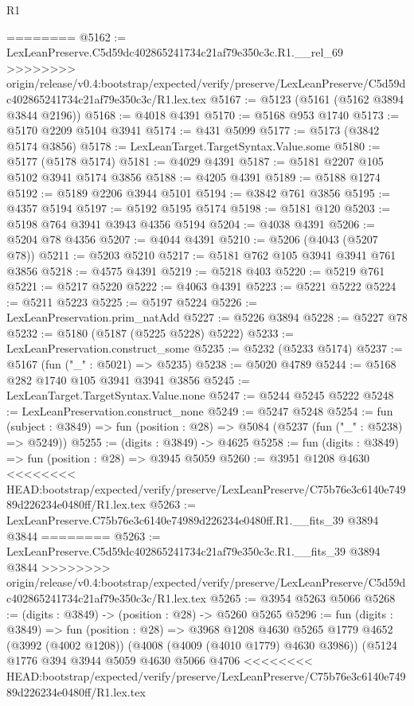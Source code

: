 \begin{lexlean}{R1}
\begin{coremodule}
{{{{{{{{{{{{{{{{{{{{{{{{{{{{{{{{{{{{{{{{{{{{{{{{{{{{{{{{{{{{{{{{{{{{{{{{{{{{{{{{{{{{{{{{{{{{{{{{{{{{{{{{{{{{{{{{{{{{{{{{{{{{{{{{{{{{{{{{{{{{{{{{{{{{{{{{{{{{{{{{{{{{{{{{{{{{{{{{{{{{{{{{{{========
@5162 := LexLeanPreserve.C5d59dc402865241734c21af79e350c3c.R1.__rel_69
>>>>>>>> origin/release/v0.4:bootstrap/expected/verify/preserve/LexLeanPreserve/C5d59dc402865241734c21af79e350c3c/R1.lex.tex
@5167 := @5123 (@5161 (@5162 @3894 @3844 @2196))
@5168 := @4018 @4391
@5170 := @5168 @953 @1740
@5173 := @5170 @2209 @5104 @3941
@5174 := @431 @5099
@5177 := @5173 (@3842 @5174 @3856)
@5178 := LexLeanTarget.TargetSyntax.Value.some
@5180 := @5177 (@5178 @5174)
@5181 := @4029 @4391
@5187 := @5181 @2207 @105 @5102 @3941 @5174 @3856
@5188 := @4205 @4391
@5189 := @5188 @1274
@5192 := @5189 @2206 @3944 @5101
@5194 := @3842 @761 @3856
@5195 := @4357 @5194
@5197 := @5192 @5195 @5174
@5198 := @5181 @120
@5203 := @5198 @764 @3941 @3943 @4356 @5194
@5204 := @4038 @4391
@5206 := @5204 @78 @4356
@5207 := @4044 @4391
@5210 := @5206 (@4043 (@5207 @78))
@5211 := @5203 @5210
@5217 := @5181 @762 @105 @3941 @3941 @761 @3856
@5218 := @4575 @4391
@5219 := @5218 @403
@5220 := @5219 @761
@5221 := @5217 @5220
@5222 := @4063 @4391
@5223 := @5221 @5222
@5224 := @5211 @5223
@5225 := @5197 @5224
@5226 := LexLeanPreservation.prim_natAdd
@5227 := @5226 @3894
@5228 := @5227 @78
@5232 := @5180 (@5187 (@5225 @5228) @5222)
@5233 := LexLeanPreservation.construct_some
@5235 := @5232 (@5233 @5174)
@5237 := @5167 (fun ("_" : @5021) => @5235)
@5238 := @5020 @4789
@5244 := @5168 @282 @1740 @105 @3941 @3941 @3856
@5245 := LexLeanTarget.TargetSyntax.Value.none
@5247 := @5244 @5245 @5222
@5248 := LexLeanPreservation.construct_none
@5249 := @5247 @5248
@5254 := fun (subject : @3849) => fun (position : @28) => @5084 (@5237 (fun ("_" : @5238) => @5249))
@5255 := (digits : @3849) -> @4625
@5258 := fun (digits : @3849) => fun (position : @28) => @3945 @5059
@5260 := @3951 @1208 @4630
<<<<<<<< HEAD:bootstrap/expected/verify/preserve/LexLeanPreserve/C75b76e3c6140e74989d226234e0480ff/R1.lex.tex
@5263 := LexLeanPreserve.C75b76e3c6140e74989d226234e0480ff.R1.__fits_39 @3894 @3844
========
@5263 := LexLeanPreserve.C5d59dc402865241734c21af79e350c3c.R1.__fits_39 @3894 @3844
>>>>>>>> origin/release/v0.4:bootstrap/expected/verify/preserve/LexLeanPreserve/C5d59dc402865241734c21af79e350c3c/R1.lex.tex
@5265 := @3954 @5263 @5066
@5268 := (digits : @3849) -> (position : @28) -> @5260 @5265
@5296 := fun (digits : @3849) =>
  fun (position : @28) =>
  @3968
    @1208
    @4630
    @5265
    @1779
    @4652
    (@3992 (@4002 @1208))
    (@4008 (@4009 (@4010 @1779) @4630 @3986))
    (@5124
      @1776
      @394
      @3944
      @5059
      @4630
      @5066
      @4706
<<<<<<<< HEAD:bootstrap/expected/verify/preserve/LexLeanPreserve/C75b76e3c6140e74989d226234e0480ff/R1.lex.tex
}}}}}}}}}}}}}}}}}}}}}}}}}}}}}}}}}}}}}}}}}}}}}}}}}}}}}}}}}}}}}}}}}}}}}}}}}}}}}}}}}}}}}}}}}}}}}}}}}}}}}}}}}}}}}}}}}}}}}}}}}}}}}}}}}}}}}}}}}}}}}}}}}}}}}}}}}}}}}}}}}}}}}}}}}}}}}}}}}}}}}}}}}}
\end{coremodule}
\end{lexlean}
